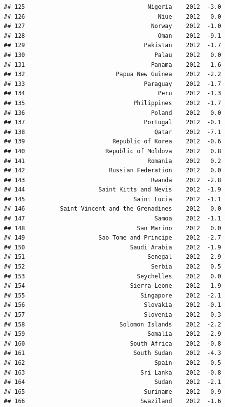 \documentclass[
]{book}
\begin{document}
\begin{verbatim}
## 125                                   Nigeria    2012  -3.0
## 126                                      Niue    2012   0.0
## 127                                    Norway    2012  -1.0
## 128                                      Oman    2012  -9.1
## 129                                  Pakistan    2012  -1.7
## 130                                     Palau    2012   0.0
## 131                                    Panama    2012  -1.6
## 132                          Papua New Guinea    2012  -2.2
## 133                                  Paraguay    2012  -1.7
## 134                                      Peru    2012  -1.3
## 135                               Philippines    2012  -1.7
## 136                                    Poland    2012   0.0
## 137                                  Portugal    2012  -0.1
## 138                                     Qatar    2012  -7.1
## 139                         Republic of Korea    2012  -0.6
## 140                       Republic of Moldova    2012   0.8
## 141                                   Romania    2012   0.2
## 142                        Russian Federation    2012   0.0
## 143                                    Rwanda    2012  -2.8
## 144                     Saint Kitts and Nevis    2012  -1.9
## 145                               Saint Lucia    2012  -1.1
## 146          Saint Vincent and the Grenadines    2012   0.0
## 147                                     Samoa    2012  -1.1
## 148                                San Marino    2012   0.0
## 149                     Sao Tome and Principe    2012  -2.7
## 150                              Saudi Arabia    2012  -1.9
## 151                                   Senegal    2012  -2.9
## 152                                    Serbia    2012   0.5
## 153                                Seychelles    2012   0.0
## 154                              Sierra Leone    2012  -1.9
## 155                                 Singapore    2012  -2.1
## 156                                  Slovakia    2012  -0.1
## 157                                  Slovenia    2012  -0.3
## 158                           Solomon Islands    2012  -2.2
## 159                                   Somalia    2012  -2.9
## 160                              South Africa    2012  -0.8
## 161                               South Sudan    2012  -4.3
## 162                                     Spain    2012  -0.5
## 163                                 Sri Lanka    2012  -0.8
## 164                                     Sudan    2012  -2.1
## 165                                  Suriname    2012  -0.9
## 166                                 Swaziland    2012  -1.6

\end{verbatim}
\end{document}
